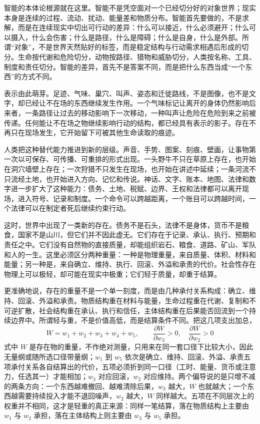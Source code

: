 智能的本体论根源就在这里。智能不是凭空面对一个已经切分好的对象世界；现实本身是连续的过程、流动、扰动、能量差和物质分布。智能首先要做的，不是求解，而是在连续现实中切出可行动的差异：什么可以接近，什么必须避开；什么可以摄入，什么会伤害；什么是路径，什么是障碍；什么是自身，什么是外部。所谓“对象”，不是世界天然贴好的标签，而是稳定结构与行动需求相遇后形成的切分。生命按代谢和危险切分，动物按路径、猎物和威胁切分，人类按名称、工具、制度和责任切分。智能的差异，首先不是答案不同，而是把什么东西当成“一个东西”的方式不同。

表示由此萌芽。足迹、气味、巢穴、叫声、姿态和迁徙路线，不是图像，也不是文字，却已经让不在场的东西继续发生作用。一个气味标记让离开的身体仍然影响后来者，一条路径让过去的移动影响下一次移动，一种叫声让危险在危险到来之前被传递。任何能让不在场之物继续影响行动的结构，都已经具有表示的影子。存在不再只在现场发生，它开始留下可被其他生命读取的痕迹。

人类把这种替代能力推进到新的层级。声音、手势、图案、刻痕、壁画，让事物第一次以可保存、可传播、可重排的形式出现。一头野牛不只在草原上存在，也开始在洞穴墙壁上存在；一次狩猎不只发生在现场，也开始在讲述中延续；一条河流不只流经土地，也开始进入方向、记忆和传说。神话、文字、账本、地图、法律和数字进一步扩大了这种能力：债务、土地、税赋、边界、王权和法律都可以离开现场，进入符号、记录和制度。一个命令可以跨越距离，一个账目可以跨越时间，一个法律可以在制定者死后继续约束行动。


这时，世界中出现了一类新的存在。债务不是石头，法律不是身体，货币不是粮食，国家不是山川，但它们并不因此虚无。它们存在于记录、承认、执行、预期和责任之中\cite{searle1995construction}。它们没有自然物的直接质量，却能组织岩石、粮食、道路、矿山、军队和人的一生。这里必须区分两种重量：一种是物理重量，来自质量、体积、材料和能量；另一种是，来自确立、维持、执行、回滚、外溢和承责的代价。社会性存在物理上可以极轻，却可能在现实中极重；它们轻于质量，却重于结算。

更准确地说，存在的重量不是一个单一刻度，而是由几种承付关系构成：确立、维持、回滚、外溢和承责。物质结构重在材料与能量，生命过程重在代谢、复制和不可逆扩散，社会结构重在承认、执行和信任，主体结构重在后果能否回流到一个持续边界中。所谓轻与重，不是价值高低，而是结算条件不同。把这几项支出加总，
\begin{equation}
W=w_{1}+w_{2}+w_{3}+w_{4}+w_{5},
\qquad
\frac{\partial W}{\partial w_{3}}>0,\quad
\frac{\partial W}{\partial w_{2}}>0
\label{eq:ontic-weight}
\end{equation}
式中 $W$ 是存在物的重量，不作绝对测量，只用来在同一套口径下比较大小，因此无量纲或随所选口径带量纲；$w_{1}$ 到 $w_{5}$ 依次是确立、维持、回滚、外溢、承责五项承付关系各自结算出的代价，五项必须折到同一口径（工时、能量、货币或注意力，任选其一）才能相加；$w_{3}$ 对应回滚，$w_{2}$ 对应维持。两个偏导说的是只增不减的两条方向：一个东西越难撤回、越难清除后果，$w_{3}$ 越大，$W$ 也就越大；一个东西越需要持续投入才能不退回噪声，$w_{2}$ 越大，$W$ 同样越大。五项在不同层次上的权重并不相同，这才是轻重的真正来源：同样一笔结算，落在物质结构上主要由 $w_{1}$ 与 $w_{2}$ 承担，落在主体结构上则主要由 $w_{3}$ 与 $w_{5}$ 承担。

